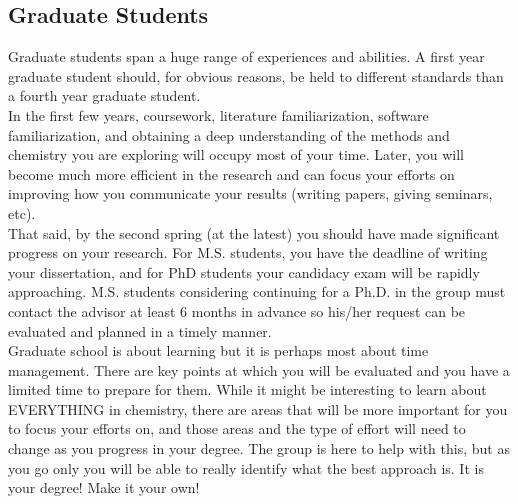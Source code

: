 \documentclass[letterpaper]{article}
\begin{document}
\subsection*{Graduate Students}
Graduate students span a huge range of experiences and abilities. A first year graduate student should, for obvious reasons, be held to different standards than a fourth year graduate student.\\

In the first few years, coursework, literature familiarization, software familiarization, and obtaining a deep understanding of the methods and chemistry you are exploring will occupy most of your time. Later, you will become much more efficient in the research and can focus your efforts on improving how you communicate your results (writing papers, giving seminars, etc). \\

That said, by the second spring (at the latest) you should have made significant progress on your research. For M.S. students, you have the deadline of writing your dissertation, and for PhD students your candidacy exam will be rapidly approaching. M.S. students considering continuing for a Ph.D. in the group must contact the advisor at least 6 months in advance so his/her request can be evaluated and planned in a timely manner. \\

Graduate school is about learning but it is perhaps most about time management.  There are key points at which you will be evaluated and you have a limited time to prepare for them. While it might be interesting to learn about EVERYTHING in chemistry, there are areas that will be more important for you to focus your efforts on, and those areas and the type of effort will need to change as you progress in your degree. The group is here to help with this, but as you go only you will be able to really identify what the best approach is. It is your degree! Make it your own!
\end{document}
